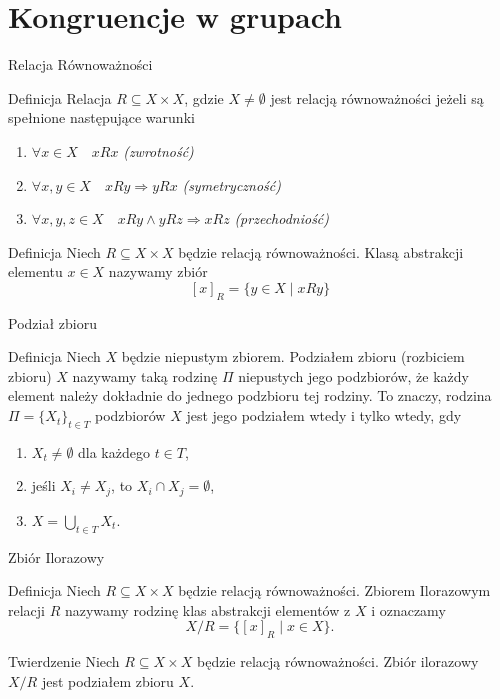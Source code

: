 \documentclass{beamer}
\begin{document}
\section{Kongruencje w grupach}

\begin{frame}{Relacja Równoważności}
    \begin{block}{Definicja}
        Relacja $R \subseteq  X \times X$, gdzie $X \neq \emptyset$ jest \alert{relacją równoważności}
        jeżeli są spełnione następujące warunki
        \begin{enumerate}
            \item $\forall x \in X \quad xRx$ \hfill \textit{(zwrotność)}
            \item $\forall x,y \in X \quad xRy \Rightarrow yRx$ \hfill \textit{(symetryczność)}
            \item $\forall x,y,z \in X \quad xRy \land yRz \Rightarrow xRz $ \hfill \textit{(przechodniość)}
        \end{enumerate}
    \end{block}
    \begin{block}{Definicja}
        Niech $R \subseteq X \times X$ będzie relacją równoważności. \alert{Klasą abstrakcji} elementu $x \in X$
        nazywamy zbiór 
        $$ [x]_R = \{ y \in X \mid xRy\}$$
    \end{block}
\end{frame}

\begin{frame}{Podział zbioru}
    \begin{block}{Definicja}
        Niech $X$ będzie niepustym zbiorem.  \alert{Podziałem zbioru} (rozbiciem zbioru) $X$ nazywamy taką
        rodzinę $\varPi$ niepustych jego podzbiorów, że każdy element należy dokładnie do jednego podzbioru tej rodziny.
        To znaczy, rodzina $\varPi = \{X_t\}_{t \in T}$ podzbiorów $X$ jest jego podziałem wtedy i tylko wtedy, gdy
        \begin{enumerate}
            \item $X_t \neq \emptyset$ dla każdego $t \in T$,
            \item jeśli $X_{i} \neq X_j$, to $X_i \cap X_j = \emptyset$,
            \item $X = \bigcup_{t \in T} X_t$.  
        \end{enumerate}
    \end{block}
\end{frame}

\begin{frame}{Zbiór Ilorazowy}
    \begin{block}{Definicja}
        Niech $R \subseteq X \times X$ będzie relacją równoważności. \alert{Zbiorem Ilorazowym} relacji $R$ nazywamy 
        rodzinę klas abstrakcji elementów z $X$ i oznaczamy
        $$ X/R = \{ [x]_R \mid x \in X\}.$$
    \end{block}
    \pause 
    \begin{block}{Twierdzenie}
        Niech $R \subseteq X \times X$ będzie relacją równoważności. Zbiór ilorazowy $X/R$ jest podziałem zbioru $X$.
    \end{block}
\end{frame}
\end{document}
